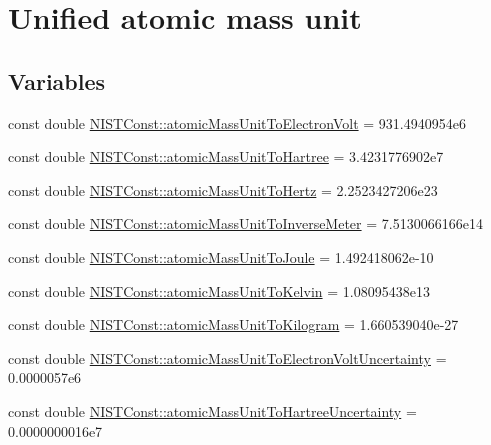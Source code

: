 \hypertarget{group___n_i_s_t_const-_atomic_mass_unit}{}\section{Unified atomic mass unit}
\label{group___n_i_s_t_const-_atomic_mass_unit}
\subsection*{Variables}
\begin{DoxyCompactItemize}
\item 
const double \hyperlink{group___n_i_s_t_const-_atomic_mass_unit_ga4a5d912289e6a828a25e9e7ae3385b0d}{N\+I\+S\+T\+Const\+::atomic\+Mass\+Unit\+To\+Electron\+Volt} = 931.\+4940954e6
\item 
const double \hyperlink{group___n_i_s_t_const-_atomic_mass_unit_ga8a6b352e1a13d0cbbc0f36f650e2c682}{N\+I\+S\+T\+Const\+::atomic\+Mass\+Unit\+To\+Hartree} = 3.\+4231776902e7
\item 
const double \hyperlink{group___n_i_s_t_const-_atomic_mass_unit_gad284f1982f0182e1e4a90e0bff793af9}{N\+I\+S\+T\+Const\+::atomic\+Mass\+Unit\+To\+Hertz} = 2.\+2523427206e23
\item 
const double \hyperlink{group___n_i_s_t_const-_atomic_mass_unit_gae1f5517810a5df9365d26887c04ada40}{N\+I\+S\+T\+Const\+::atomic\+Mass\+Unit\+To\+Inverse\+Meter} = 7.\+5130066166e14
\item 
const double \hyperlink{group___n_i_s_t_const-_atomic_mass_unit_gaea7c1916a35df8824ac6a67be3f65f33}{N\+I\+S\+T\+Const\+::atomic\+Mass\+Unit\+To\+Joule} = 1.\+492418062e-\/10
\item 
const double \hyperlink{group___n_i_s_t_const-_atomic_mass_unit_gaf9c3a2dfd69d4e74cee3361abd7d7ecf}{N\+I\+S\+T\+Const\+::atomic\+Mass\+Unit\+To\+Kelvin} = 1.\+08095438e13
\item 
const double \hyperlink{group___n_i_s_t_const-_atomic_mass_unit_gafdd40d93803d15e1ff887dc12c49ca99}{N\+I\+S\+T\+Const\+::atomic\+Mass\+Unit\+To\+Kilogram} = 1.\+660539040e-\/27
\item 
const double \hyperlink{group___n_i_s_t_const-_atomic_mass_unit_ga5b9ec7f36c14dabc54a16d1e076bee14}{N\+I\+S\+T\+Const\+::atomic\+Mass\+Unit\+To\+Electron\+Volt\+Uncertainty} = 0.\+0000057e6
\item 
const double \hyperlink{group___n_i_s_t_const-_atomic_mass_unit_ga99d6950b6326e7131f95abe5c90fb8da}{N\+I\+S\+T\+Const\+::atomic\+Mass\+Unit\+To\+Hartree\+Uncertainty} = 0.\+0000000016e7

\end{DoxyCompactItemize}
